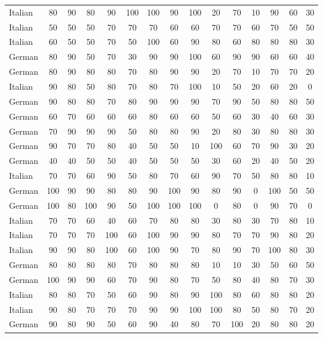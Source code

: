 \begin{table}[htbp]
\begin{tabular}{lcccccccccccccc}
Italian & 80 & 90 & 80 & 90 & 100 & 100 & 90 & 100 & 20 & 70 & 10 & 90 & 60 & 30 \\
Italian & 50 & 50 & 50 & 70 & 70 & 70 & 60 & 60 & 70 & 70 & 60 & 70 & 50 & 50 \\
Italian & 60 & 50 & 50 & 70 & 50 & 100 & 60 & 90 & 80 & 60 & 80 & 80 & 80 & 30 \\
German & 80 & 90 & 50 & 70 & 30 & 90 & 90 & 100 & 60 & 90 & 90 & 60 & 60 & 40 \\
German & 80 & 90 & 80 & 80 & 70 & 80 & 90 & 90 & 20 & 70 & 10 & 70 & 70 & 20 \\
Italian & 90 & 80 & 50 & 80 & 70 & 80 & 70 & 100 & 10 & 50 & 20 & 60 & 20 & 0 \\
German & 90 & 80 & 80 & 70 & 80 & 90 & 90 & 90 & 70 & 90 & 50 & 80 & 80 & 50 \\
German & 60 & 70 & 60 & 60 & 60 & 80 & 60 & 60 & 50 & 60 & 30 & 40 & 60 & 30 \\
German & 70 & 90 & 90 & 90 & 50 & 80 & 80 & 90 & 20 & 80 & 30 & 80 & 80 & 30 \\
German & 90 & 70 & 70 & 80 & 40 & 50 & 50 & 10 & 100 & 60 & 70 & 90 & 30 & 20 \\
German & 40 & 40 & 50 & 50 & 40 & 50 & 50 & 50 & 30 & 60 & 20 & 40 & 50 & 20 \\
Italian & 70 & 70 & 60 & 90 & 50 & 80 & 70 & 60 & 90 & 70 & 50 & 80 & 80 & 10 \\
German & 100 & 90 & 90 & 80 & 80 & 90 & 100 & 90 & 80 & 90 & 0 & 100 & 50 & 50 \\
German & 100 & 80 & 100 & 90 & 50 & 100 & 100 & 100 & 0 & 80 & 0 & 90 & 70 & 0 \\
Italian & 70 & 70 & 60 & 40 & 60 & 70 & 80 & 80 & 30 & 80 & 30 & 70 & 80 & 10 \\
Italian & 70 & 70 & 70 & 100 & 60 & 100 & 90 & 90 & 80 & 70 & 70 & 90 & 80 & 20 \\
Italian & 90 & 90 & 80 & 100 & 60 & 100 & 90 & 70 & 80 & 90 & 70 & 100 & 80 & 30 \\
German & 80 & 80 & 80 & 80 & 70 & 80 & 80 & 80 & 10 & 10 & 30 & 50 & 60 & 50 \\
German & 100 & 90 & 90 & 60 & 70 & 90 & 80 & 70 & 50 & 80 & 40 & 80 & 70 & 30 \\
Italian & 80 & 80 & 70 & 50 & 60 & 90 & 80 & 90 & 100 & 80 & 60 & 80 & 80 & 20 \\
Italian & 90 & 80 & 70 & 70 & 70 & 90 & 90 & 100 & 100 & 80 & 50 & 80 & 70 & 20 \\
German & 90 & 80 & 90 & 50 & 60 & 90 & 40 & 80 & 70 & 100 & 20 & 80 & 80 & 20 \\

\end{tabular}
\end{table}

